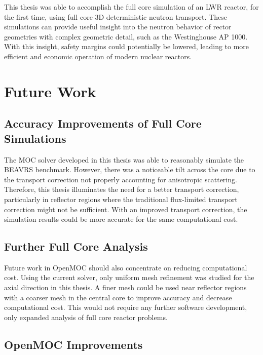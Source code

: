 This thesis was able to accomplish the full core simulation of an \ac{LWR} reactor, for the first time, using full core 3D deterministic neutron transport. These simulations can provide useful insight into the neutron behavior of rector geometries with complex geometric detail, such as the Westinghouse AP 1000\texttrademark. With this insight, safety margins could potentially be lowered, leading to more efficient and economic operation of modern nuclear reactors.

\section{Future Work}
\label{sec:future-work}

\subsection{Accuracy Improvements of Full Core Simulations}

The \ac{MOC} solver developed in this thesis was able to reasonably simulate the BEAVRS benchmark. However, there was a noticeable tilt across the core due to the transport correction not properly accounting for anisotropic scattering. Therefore, this thesis illuminates the need for a better transport correction, particularly in reflector regions where the traditional flux-limited transport correction might not be sufficient. With an improved transport correction, the simulation results could be more accurate for the same computational cost.

\subsection{Further Full Core Analysis}

Future work in OpenMOC should also concentrate on reducing computational cost. Using the current solver, only uniform mesh refinement was studied for the axial direction in this thesis. A finer mesh could be used near reflector regions with a coarser mesh in the central core to improve accuracy and decrease computational cost. This would not require any further software development, only expanded analysis of full core reactor problems.

\subsection{OpenMOC Improvements}

